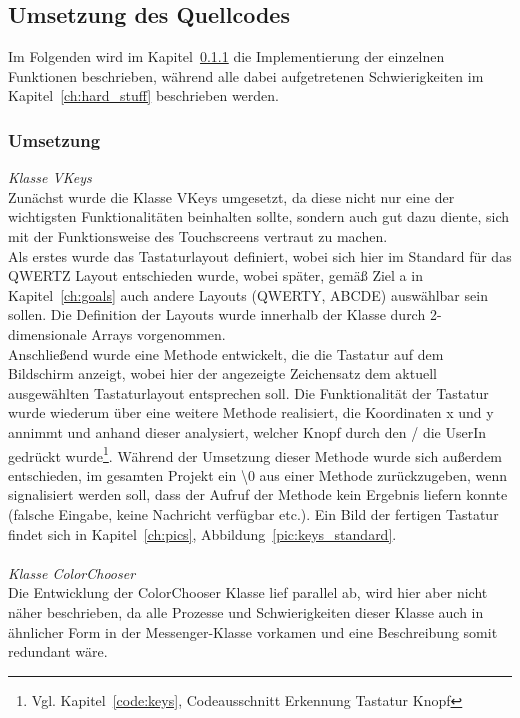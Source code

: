 \documentclass[a4paper, 11pt]{scrartcl}
\begin{document}
\subsection{Umsetzung des Quellcodes}
Im Folgenden wird im Kapitel~\ref{ch:umsetzung_umsetzung} die Implementierung der einzelnen Funktionen beschrieben, während alle dabei aufgetretenen Schwierigkeiten
im Kapitel~\ref{ch:hard_stuff} beschrieben werden.
\subsubsection{Umsetzung}\label{ch:umsetzung_umsetzung}
\textit{Klasse VKeys}
\\
Zunächst wurde die Klasse VKeys umgesetzt, da diese nicht nur eine der wichtigsten Funktionalitäten beinhalten sollte, sondern auch gut dazu diente, 
sich mit der Funktionsweise des Touchscreens vertraut zu machen. 
\\
Als erstes wurde das Tastaturlayout definiert, wobei sich hier im Standard für das QWERTZ Layout entschieden wurde, wobei später, gemäß Ziel a in Kapitel~\ref{ch:goals}
auch andere Layouts (QWERTY, ABCDE) auswählbar sein sollen. Die Definition der Layouts wurde innerhalb der Klasse durch 2-dimensionale Arrays vorgenommen.
\\
Anschließend wurde eine Methode entwickelt, die die Tastatur auf dem Bildschirm anzeigt, wobei hier der angezeigte Zeichensatz dem aktuell ausgewählten Tastaturlayout 
entsprechen soll. Die Funktionalität der Tastatur wurde wiederum über eine weitere Methode realisiert, die Koordinaten x und y annimmt und anhand dieser analysiert, 
welcher Knopf durch den / die UserIn gedrückt wurde\footnote{Vgl. Kapitel~\ref{code:keys}, Codeausschnitt \glqq Erkennung Tastatur Knopf\grqq}. Während der Umsetzung 
dieser Methode wurde sich außerdem entschieden, im gesamten Projekt ein \glqq\textbackslash 0\grqq{} aus einer Methode zurückzugeben, wenn signalisiert werden soll, dass der
Aufruf der Methode kein Ergebnis liefern konnte (falsche Eingabe, keine Nachricht verfügbar etc.). Ein Bild der fertigen Tastatur findet sich in Kapitel~\ref{ch:pics},
Abbildung~\ref{pic:keys_standard}.
\\
\\
\textit{Klasse ColorChooser}
\\
Die Entwicklung der ColorChooser Klasse lief parallel ab, wird hier aber nicht näher beschrieben, da alle Prozesse und Schwierigkeiten dieser Klasse auch in ähnlicher Form in 
der Messenger-Klasse vorkamen und eine Beschreibung somit redundant wäre.
\end{document}
